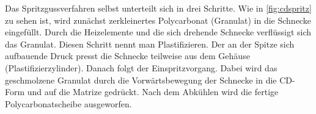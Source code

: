 Das Spritzgussverfahren selbst unterteilt sich in drei Schritte. Wie in
\autoref{fig:cdspritz} zu sehen ist, wird zunächst zerkleinertes Polycarbonat
(Granulat) in die Schnecke eingefüllt. Durch die Heizelemente und die sich
drehende Schnecke verflüssigt sich das Granulat. Diesen Schritt nennt man
Plastifizieren. Der an der Spitze sich aufbauende Druck presst die Schnecke
teilweise aus dem Gehäuse (Plastifizierzylinder). Danach folgt der
Einspritzvorgang. Dabei wird das geschmolzene Granulat durch die
Vorwärtsbewegung der Schnecke in die CD-Form und auf die Matrize gedrückt. Nach
dem Abkühlen wird die fertige Polycarbonatscheibe ausgeworfen. \cite{cdpf}

